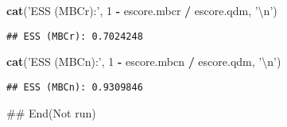 \documentclass[]{article}
\newenvironment{Shaded}{\begin{snugshade}}{\end{snugshade}}
\newcommand{\CharTok}[1]{\textcolor[rgb]{0.31,0.60,0.02}{#1}}
\newcommand{\DecValTok}[1]{\textcolor[rgb]{0.00,0.00,0.81}{#1}}
\newcommand{\KeywordTok}[1]{\textcolor[rgb]{0.13,0.29,0.53}{\textbf{#1}}}
\newcommand{\NormalTok}[1]{#1}
\newcommand{\OperatorTok}[1]{\textcolor[rgb]{0.81,0.36,0.00}{\textbf{#1}}}
\newcommand{\StringTok}[1]{\textcolor[rgb]{0.31,0.60,0.02}{#1}}
\begin{document}
\begin{Shaded}
\begin{Highlighting}[]
\KeywordTok{cat}\NormalTok{(}\StringTok{'ESS (MBCr):'}\NormalTok{, }\DecValTok{1} \OperatorTok{-}\StringTok{ }\NormalTok{escore.mbcr }\OperatorTok{/}\StringTok{ }\NormalTok{escore.qdm, }\StringTok{'}\CharTok{\textbackslash{}n}\StringTok{'}\NormalTok{)}
\end{Highlighting}
\end{Shaded}

\begin{verbatim}
## ESS (MBCr): 0.7024248
\end{verbatim}

\begin{Shaded}
\begin{Highlighting}[]
\KeywordTok{cat}\NormalTok{(}\StringTok{'ESS (MBCn):'}\NormalTok{, }\DecValTok{1} \OperatorTok{-}\StringTok{ }\NormalTok{escore.mbcn }\OperatorTok{/}\StringTok{ }\NormalTok{escore.qdm, }\StringTok{'}\CharTok{\textbackslash{}n}\StringTok{'}\NormalTok{)}
\end{Highlighting}
\end{Shaded}

\begin{verbatim}
## ESS (MBCn): 0.9309846
\end{verbatim}

\begin{Shaded}
\begin{Highlighting}[]
\NormalTok{## End(Not run)}
\end{Highlighting}
\end{Shaded}
\end{document}

